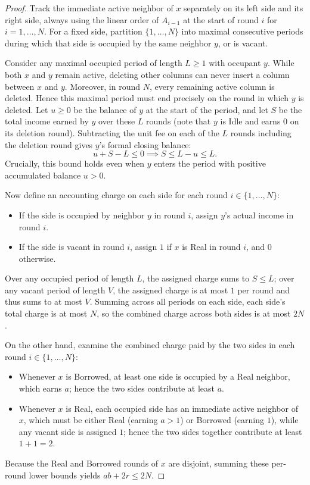 \documentclass[11pt,a4paper]{article}
\theoremstyle{remark}
\begin{document}
\begin{proof}
Track the immediate active neighbor of $x$ separately on its left side and its right side, always using the linear order of $A_{i-1}$ at the start of round $i$ for $i = 1, \dots, N$. For a fixed side, partition $\{1, \dots, N\}$ into maximal consecutive periods during which that side is occupied by the same neighbor $y$, or is vacant.

Consider any maximal occupied period of length $L \ge 1$ with occupant $y$. While both $x$ and $y$ remain active, deleting other columns can never insert a column between $x$ and $y$. Moreover, in round $N$, every remaining active column is deleted. Hence this maximal period must end precisely on the round in which $y$ is deleted. Let $u \ge 0$ be the balance of $y$ at the start of the period, and let $S$ be the total income earned by $y$ over these $L$ rounds (note that $y$ is Idle and earns $0$ on its deletion round). Subtracting the unit fee on each of the $L$ rounds including the deletion round gives $y$'s formal closing balance:
\[
  u + S - L \le 0 \implies S \le L - u \le L.
\]
Crucially, this bound holds even when $y$ enters the period with positive accumulated balance $u > 0$.

Now define an accounting charge on each side for each round $i \in \{1, \dots, N\}$:
\begin{itemize}
  \item If the side is occupied by neighbor $y$ in round $i$, assign $y$'s actual income in round $i$.
  \item If the side is vacant in round $i$, assign $1$ if $x$ is Real in round $i$, and $0$ otherwise.
\end{itemize}
Over any occupied period of length $L$, the assigned charge sums to $S \le L$; over any vacant period of length $V$, the assigned charge is at most $1$ per round and thus sums to at most $V$. Summing across all periods on each side, each side's total charge is at most $N$, so the combined charge across both sides is at most $2N$.

On the other hand, examine the combined charge paid by the two sides in each round $i \in \{1, \dots, N\}$:
\begin{itemize}
  \item Whenever $x$ is Borrowed, at least one side is occupied by a Real neighbor, which earns $a$; hence the two sides contribute at least $a$.
  \item Whenever $x$ is Real, each occupied side has an immediate active neighbor of $x$, which must be either Real (earning $a > 1$) or Borrowed (earning $1$), while any vacant side is assigned $1$; hence the two sides together contribute at least $1 + 1 = 2$.
\end{itemize}
Because the Real and Borrowed rounds of $x$ are disjoint, summing these per-round lower bounds yields $ab + 2r \le 2N$.
\end{proof}
\end{document}
